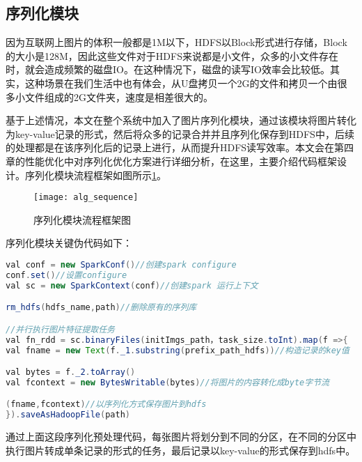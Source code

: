 \subsection{序列化模块}
因为互联网上图片的体积一般都是1M以下，HDFS以Block形式进行存储，Block的大小是128M，因此这些文件对于HDFS来说都是小文件，众多的小文件存在时，就会造成频繁的磁盘IO。在这种情况下，磁盘的读写IO效率会比较低。其实，这种场景在我们生活中也有体会，从U盘拷贝一个2G的文件和拷贝一个由很多小文件组成的2G文件夹，速度是相差很大的。

基于上述情况，本文在整个系统中加入了图片序列化模块，通过该模块将图片转化为key-value记录的形式，然后将众多的记录合并并且序列化保存到HDFS中，后续的处理都是在该序列化后的记录上进行，从而提升HDFS读写效率。本文会在第四章的性能优化中对序列化优化方案进行详细分析，在这里，主要介绍代码框架设计。序列化模块流程框架如图所示\ref{fig:alg_sequence}。
\begin{figure}[htp]
\centering
\texttt{[image: alg\_sequence]}
\caption{序列化模块流程框架图}
\label{fig:alg_sequence}
\end{figure}

序列化模块关键伪代码如下：
\begin{lstlisting}[language=Java]
val conf = new SparkConf()//创建spark configure
conf.set()//设置configure
val sc = new SparkContext(conf)//创建spark 运行上下文

rm_hdfs(hdfs_name,path)//删除原有的序列库

//并行执行图片特征提取任务
val fn_rdd = sc.binaryFiles(initImgs_path，task_size.toInt).map(f =>{
val fname = new Text(f._1.substring(prefix_path_hdfs))//构造记录的key值

val bytes = f._2.toArray()
val fcontext = new BytesWritable(bytes)//将图片的内容转化成byte字节流

(fname,fcontext)//以序列化方式保存图片到hdfs
}).saveAsHadoopFile(path)
\end{lstlisting}

通过上面这段序列化预处理代码，每张图片将划分到不同的分区，在不同的分区中执行图片转成单条记录的形式的任务，最后记录以key-value的形式保存到hdfs中。
